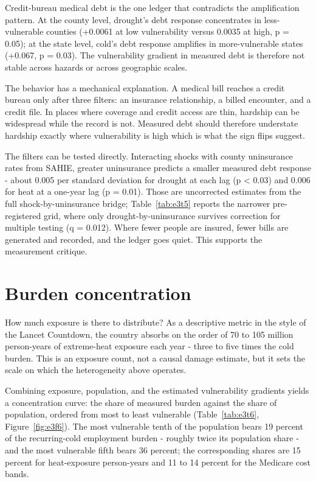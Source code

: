 \documentclass[a4paper,11pt]{article}
\begin{document}
Credit-bureau medical debt is the one ledger that contradicts the amplification pattern. At the county level, drought's debt response concentrates in less-vulnerable counties (+0.0061 at low vulnerability versus \textminus{}0.0035 at high, p = 0.05); at the state level, cold's debt response amplifies in more-vulnerable states (+0.067, p = 0.03). The vulnerability gradient in measured debt is therefore not stable across hazards or across geographic scales.

The behavior has a mechanical explanation. A medical bill reaches a credit bureau only after three filters: an insurance relationship, a billed encounter, and a credit file. In places where coverage and credit access are thin, hardship can be widespread while the record is not. Measured debt should therefore understate hardship exactly where vulnerability is high which is what the sign flips suggest.

The filters can be tested directly. Interacting shocks with county uninsurance rates from SAHIE, greater uninsurance predicts a smaller measured debt response - about \textminus{}0.005 per standard deviation for drought at each lag (p < 0.03) and \textminus{}0.006 for heat at a one-year lag (p = 0.01). Those are uncorrected estimates from the full shock-by-uninsurance bridge; Table~\ref{tab:e3t5} reports the narrower pre-registered grid, where only drought-by-uninsurance survives correction for multiple testing (q = 0.012). Where fewer people are insured, fewer bills are generated and recorded, and the ledger goes quiet. This supports the measurement critique.



\FloatBarrier
\section{Burden concentration}

How much exposure is there to distribute? As a descriptive metric in the style of the Lancet Countdown, the country absorbs on the order of 70 to 105 million person-years of extreme-heat exposure each year - three to five times the cold burden. This is an exposure count, not a causal damage estimate, but it sets the scale on which the heterogeneity above operates.

Combining exposure, population, and the estimated vulnerability gradients yields a concentration curve: the share of measured burden against the share of population, ordered from most to least vulnerable (Table~\ref{tab:e3t6}, Figure~\ref{fig:e3f6}). The most vulnerable tenth of the population bears 19 percent of the recurring-cold employment burden - roughly twice its population share - and the most vulnerable fifth bears 36 percent; the corresponding shares are 15 percent for heat-exposure person-years and 11 to 14 percent for the Medicare cost bands.
\end{document}
